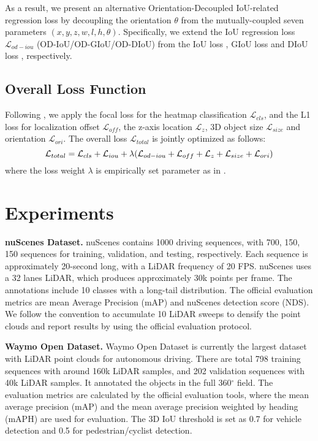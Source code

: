 \documentclass[runningheads]{llncs}
\begin{document}
As a result, we present an alternative Orientation-Decoupled IoU-related regression loss by decoupling the orientation $\theta$ from the mutually-coupled seven parameters $(x, y, z, w, l, h, \theta)$.
Specifically, we extend the IoU regression loss $\mathcal{L}_{od-iou}$ (OD-IoU/OD-GIoU/OD-DIoU) from the IoU loss \cite{rezatofighi2019generalized}, GIoU loss \cite{rezatofighi2019generalized} and DIoU loss \cite{zheng2020distance}, respectively.


\subsection{Overall Loss Function}

Following \cite{yin2021center}, we apply the focal loss \cite{lin2017focal} for the heatmap classification $\mathcal{L}_{cls}$, and the L1 loss for localization offset $\mathcal{L}_{off}$, the z-axis location $\mathcal{L}_{z}$, 3D object size $\mathcal{L}_{size}$ and orientation $\mathcal{L}_{ori}$.
The overall loss $\mathcal{L}_{total}$ is jointly optimized as follows:
\begin{equation}
\centering
\mathcal{L}_{total} = \mathcal{L}_{cls} + \mathcal{L}_{iou} + \lambda (\mathcal{L}_{od-iou} + \mathcal{L}_{off} + \mathcal{L}_{z} + \mathcal{L}_{size} + \mathcal{L}_{ori})
\label{eq:one-loss}
\end{equation}
where the loss weight $\lambda$ is empirically set parameter as in \cite{yin2021center}.


\section{Experiments}
\label{sec:experiment}

{\flushleft \bf nuScenes Dataset.}
nuScenes \cite{caesar2020nuscenes} contains 1000 driving sequences, with 700, 150, 150 sequences for training, validation, and testing, respectively. Each sequence is approximately 20-second long, with a LiDAR frequency of 20 FPS. 
nuScenes uses a 32 lanes LiDAR, which produces approximately 30k points per frame. The annotations include 10 classes with a long-tail distribution. The official evaluation metrics are mean Average Precision (mAP) and nuScenes detection score (NDS). 
We follow the convention to accumulate 10 LiDAR sweeps to densify the point clouds and report results by using the official evaluation protocol.

{\flushleft \bf Waymo Open Dataset.}
Waymo Open Dataset \cite{sun2020scalability} is currently the largest dataset with LiDAR point clouds for autonomous driving. There are total 798 training sequences with around 160k LiDAR samples, and 202 validation sequences with 40k LiDAR samples. It annotated the objects in the full 360$^{\circ}$ field. The evaluation metrics are calculated by the official evaluation tools, where the mean average precision (mAP) and the mean average precision weighted by heading (mAPH) are used for evaluation. The 3D IoU threshold is set as 0.7 for vehicle detection and 0.5 for pedestrian/cyclist detection. 
\end{document}
